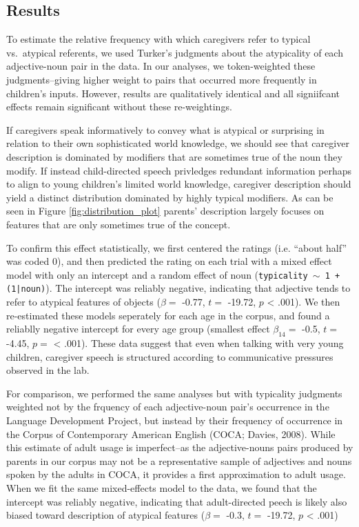 \documentclass[10pt, letterpaper]{article}
\begin{document}
\hypertarget{results}{%
\subsection{Results}\label{results}}

To estimate the relative frequency with which caregivers refer to
typical vs.~atypical referents, we used Turker's judgments about the
atypicality of each adjective-noun pair in the data. In our analyses, we
token-weighted these judgments--giving higher weight to pairs that
occurred more frequently in children's inputs. However, results are
qualitatively identical and all signiifcant effects remain significant
without these re-weightings.

If caregivers speak informatively to convey what is atypical or
surprising in relation to their own sophisticated world knowledge, we
should see that caregiver description is dominated by modifiers that are
sometimes true of the noun they modify. If instead child-directed speech
privledges redundant information perhaps to align to young children's
limited world knowledge, caregiver description should yield a distinct
distribution dominated by highly typical modifiers. As can be seen in
Figure \ref{fig:distribution_plot} parents' description largely focuses
on features that are only sometimes true of the concept.

To confirm this effect statistically, we first centered the ratings
(i.e. ``about half'' was coded 0), and then predicted the rating on each
trial with a mixed effect model with only an intercept and a random
effect of noun (\texttt{typicality $\sim$ 1 + (1|noun)}). The intercept
was reliably negative, indicating that adjective tends to refer to
atypical features of objects (\(\beta =\) -0.77, \(t =\) -19.72, \(p\)
\textless{} .001). We then re-estimated these models seperately for each
age in the corpus, and found a reliablly negative intercept for every
age group (smallest effect \(\beta_{14} =\) -0.5, \(t =\) -4.45, \(p =\)
\textless{} .001). These data suggest that even when talking with very
young children, caregiver speech is structured according to
communicative pressures observed in the lab.

For comparison, we performed the same analyses but with typicality
judgments weighted not by the frquency of each adjective-noun pair's
occurrence in the Language Development Project, but instead by their
frequency of occurrence in the Corpus of Contemporary American English
(COCA; Davies, 2008). While this estimate of adult usage is
imperfect--as the adjective-nouns pairs produced by parents in our
corpus may not be a representative sample of adjectives and nouns spoken
by the adults in COCA, it provides a first approximation to adult usage.
When we fit the same mixed-effects model to the data, we found that the
intercept was reliably negative, indicating that adult-directed peech is
likely also biased toward description of atypical features (\(\beta =\)
-0.3, \(t =\) -19.72, \(p\) \textless{} .001)
\end{document}
